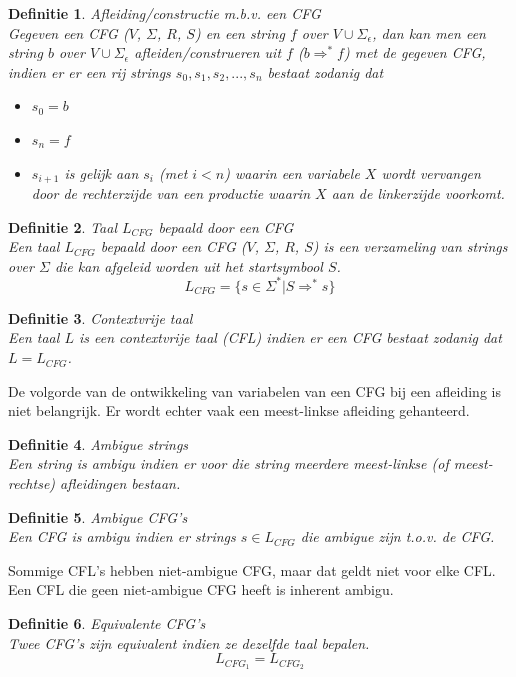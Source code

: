 \documentclass[a4paper]{article}
\newtheorem{tdefinitie}{Definitie}[section]
\newenvironment{definitie}[1]%
  {\begin{mdframed}[backgroundcolor=silver,
    topline=false,
    rightline=false,
    leftline=false,
    bottomline=false]\begin{tdefinitie}#1\\\normalfont}%
  {\end{tdefinitie}\end{mdframed}}
\newcommand{\sstar}{\ensuremath{\Sigma^*}}
\begin{document}
\begin{definitie}{Afleiding/constructie m.b.v. een CFG}
  Gegeven een CFG ($V$, $\Sigma$, $R$, $S$) en een string $f$ over $V \cup \Sigma_\epsilon$, dan kan men een string $b$ over $V \cup \Sigma_\epsilon$ afleiden/construeren uit $f$ ($b \Rightarrow^* f$) met de gegeven CFG, indien er er een rij strings $s_0,s_1,s_2,...,s_n$ bestaat zodanig dat
  \begin{itemize}
  \item $s_0 = b$
  \item $s_n = f$
  \item $s_{i+1}$ is gelijk aan $s_i$ (met $i < n$) waarin een variabele $X$ wordt vervangen door de rechterzijde van een productie waarin $X$ aan de linkerzijde voorkomt.
  \end{itemize}
\end{definitie}

\begin{definitie}{Taal $L_{CFG}$ bepaald door een CFG}
  Een taal $L_{CFG}$ bepaald door een CFG ($V$, $\Sigma$, $R$, $S$) is een verzameling van strings over $\Sigma$ die kan afgeleid worden uit het startsymbool $S$.
  \begin{equation*}
  L_{CFG} = \{s \in \sstar|S \Rightarrow^* s\}
  \end{equation*}
\end{definitie}

\begin{definitie}{Contextvrije taal}
  Een taal $L$ is een contextvrije taal (CFL) indien er een CFG bestaat zodanig dat $L = L_{CFG}$.
\end{definitie}

De volgorde van de ontwikkeling van variabelen van een CFG bij een afleiding is niet belangrijk. Er wordt echter vaak een meest-linkse afleiding gehanteerd.

\begin{definitie}{Ambigue strings}
  Een string is ambigu indien er voor die string meerdere meest-linkse (of meest-rechtse) afleidingen bestaan.
\end{definitie}

\begin{definitie}{Ambigue CFG's}
  Een CFG is ambigu indien er strings $s \in L_{CFG}$ die ambigue zijn t.o.v. de CFG.
\end{definitie}
Sommige CFL's hebben niet-ambigue CFG, maar dat geldt niet voor elke CFL. Een CFL die geen niet-ambigue CFG heeft is inherent ambigu.

\begin{definitie}{Equivalente CFG's}
  Twee CFG's zijn equivalent indien ze dezelfde taal bepalen.
  \begin{equation*}
  L_{CFG_1} = L_{CFG_2}
  \end{equation*}
\end{definitie}
\end{document}
